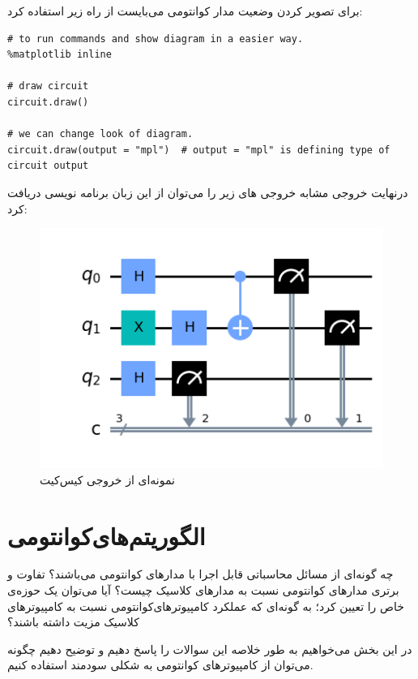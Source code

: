 \documentclass{book}
\begin{document}
برای تصویر کردن وضعیت مدار کوانتومی می‌بایست از راه زیر استفاده کرد:

\begin{latin}
\begin{verbatim}
# to run commands and show diagram in a easier way.
%matplotlib inline 

# draw circuit
circuit.draw()

# we can change look of diagram.
circuit.draw(output = "mpl")  # output = "mpl" is defining type of circuit output

\end{verbatim}
\end{latin}

درنهایت خروجی مشابه خروجی های زیر را می‌توان از این زبان برنامه نویسی دریافت کرد:

\begin{center}
\begin{figure}[h]
\centering
\includegraphics[]{tutorials_circuits_advanced_03_advanced_circuit_visualization_7_0.png}
\caption{نمونه‌ای از خروجی کیس‌کیت}
\end{figure}
\end{center}
\let\cleardoublepage\clearpage
\chapter{الگوریتم‌های‌کوانتومی‌}


چه گونه‌ای از مسائل محاسباتی قابل اجرا با مدارهای کوانتومی می‌باشند؟ 
تفاوت و برتری مدار‌های کوانتومی نسبت به مدار‌های کلاسیک چیست؟
آیا می‌توان یک حوزه‌ی خاص را تعیین کرد؛ به گونه‌ای که عملکرد کامپیوترهای‌‌کوانتومی نسبت به کامپیوتر‌های کلاسیک مزیت داشته باشند؟

در این بخش می‌خواهیم به طور خلاصه این سوالات را پاسخ دهیم و توضیح دهیم چگونه می‌توان از کامپیوتر‌های کوانتومی به شکلی سودمند استفاده کنیم.
\end{document}
